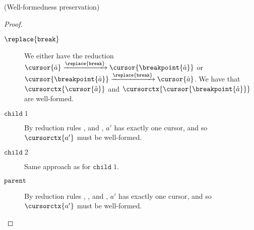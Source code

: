 \begin{lemma}{(Well-formedness preservation)}
\begin{proof}
\begin{description}
\begin{description}
%
\item[$\replace{\texttt{break}}$] We either have the reduction $\cursor{\hat{a}} \xrightarrow{\replace{\texttt{break}}} \cursor{\breakpoint{\hat{a}}}$ or $\cursor{\breakpoint{\hat{a}}} \xrightarrow{\replace{\texttt{break}}} \cursor{\hat{a}}$. We have that $\cursorctx{\cursor{\hat{a}}}$ and $\cursorctx{\cursor{\breakpoint{\hat{a}}}}$ are well-formed.
%
\item[$\texttt{child}\; 1$] By reduction rules ,  and , $a'$ has exactly one cursor, and so $\cursorctx{a'}$ must be well-formed.
%
\item[$\texttt{child}\; 2$] Same approach as for $\texttt{child}\; 1$.
%
\item[$\texttt{parent}$] By reduction rules , ,  and , $a'$ has exactly one cursor, and so $\cursorctx{a'}$ must be well-formed.
%
\end{description}
%
\end{description}
\end{proof}
\end{lemma}